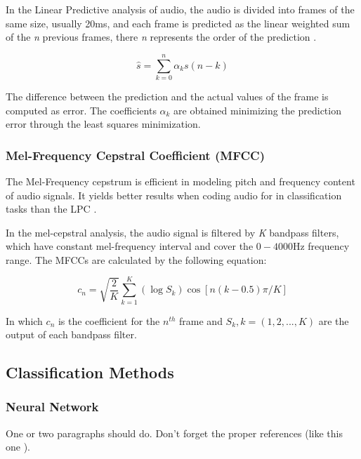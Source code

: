 \documentclass[12pt]{article}
\begin{document}
In the Linear Predictive analysis of audio, the audio is divided into frames of the same size, usually 20ms, and each frame is predicted as the linear weighted sum of the \textit{n} previous frames, there \textit{n} represents the order of the prediction \cite{Rabiner:1993:FSR:153687}. 

\begin{equation}
	\hat{s} = \sum_{k=0}^{n} \alpha_ks(n-k)
	\label{eq:lpc}
\end{equation}


The difference between the prediction and the actual values of the frame is computed as error. The coefficients $\alpha_k$ are obtained minimizing the prediction error through the least squares minimization.


\subsubsection{Mel-Frequency Cepstral Coefficient (MFCC)} \label{class:mfcc}

The Mel-Frequency cepstrum is efficient in modeling pitch and frequency content of audio signals. It yields better results when coding audio for in classification tasks than the LPC \cite{li2001classification}.

In the mel-cepstral analysis, the audio signal is filtered by \textit{K} bandpass filters, which have constant mel-frequency interval and cover the $0-4000$Hz frequency range. The MFCCs are calculated by the following equation:

\begin{equation}
	c_n = \sqrt{\frac{2}{K}} \sum_{k=1}^{K} (\log S_k) \cos [n(k-0.5)\pi/K]
	\label{eq:mfcc}
\end{equation}

In which $c_n$ is the coefficient for the $n^{th}$ frame and $S_k, k=(1,2,...,K)$ are the output of each bandpass filter.

\subsection{Classification Methods} \label{class:meth}

\subsubsection{Neural Network} \label{class:nn}

One or two paragraphs should do. Don't forget the proper references (like this one \cite{lei2014novel}).
\end{document}
